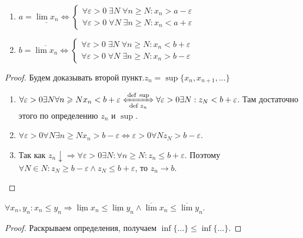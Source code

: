 \begin{theorem}
    \slashn
    \begin{enumerate}
        \item $a = \underline{\lim x_n} \iff
            \begin{cases}
                \forall \varepsilon > 0\; \exists N \; \forall n \ge N: x_n > a - \varepsilon \\
                \forall \varepsilon >0\; \forall N\; \exists n \ge N: x_n < a + \varepsilon
            \end{cases}
            $
        \item $b = \overline{\lim x_n} \iff
            \begin{cases}
                \forall \varepsilon > 0\; \exists N \; \forall n \ge N: x_n < b + \varepsilon \\
                \forall \varepsilon >0\; \forall N\; \exists n \ge N: x_n > b - \varepsilon
            \end{cases} 
            $
    \end{enumerate}
\end{theorem}
\begin{proof}
   Будем доказывать второй пункт.$z_n = \sup \{x_n, x_{n+1}, \ldots\}$
   \begin{enumerate}
       \item $\forall \varepsilon > 0 \exists N \forall n \ge N x_n < b + \varepsilon \xLeftrightarrow[\text{def } z_n]{\text{def } \sup} \forall \varepsilon > 0 \exists N: z_N < b + \varepsilon$. Там достаточно этого по определению $z_n$ и  $\sup$.
       \item  $\forall \varepsilon > 0 \forall N \exists n \ge N x_n > b-\varepsilon \iff \varepsilon > 0 \forall N z_N > b - \varepsilon$. 
       \item Так как $z_n \downarrow \Rightarrow \forall \varepsilon > 0 \exists N: \forall n \ge N: z_n \le b + \varepsilon$. Поэтому $\forall N \in N: z_N \ge b - \varepsilon \land z_N \le b + \varepsilon$, то $z_n \to b$.
   \end{enumerate}
\end{proof}
\begin{theorem}
    $\forall x_n, y_n: x_n \le y_n \Rightarrow \underline{\lim} x_n \le \underline{\lim} y_n \land \overline{\lim} x_n \le \overline{\lim} y_n$.
\end{theorem}
\begin{proof}
    Раскрываем определения, получаем $\inf \{\ldots\} \le \inf\{\ldots\}$. 
\end{proof}
